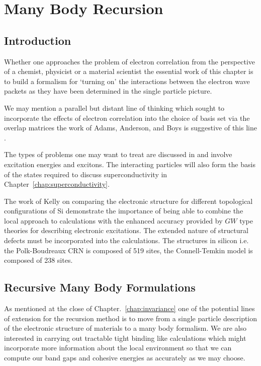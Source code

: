 \chapter{Many Body Recursion}
\section{Introduction}
Whether one approaches the problem of electron correlation from the
perspective of a chemist, physicist or a material scientist the 
essential work of this chapter is to build a formalism for `turning on'
the interactions between the electron wave packets as they have been 
determined in the single particle picture. 

We may mention a parallel but distant line of thinking
which sought to incorporate the effects of electron correlation
into the choice of basis set via the overlap matrices the work
of Adams, Anderson, and Boys is suggestive of this 
line \cite{adams62, weeks73}. 

The types of problems one may want to treat are discussed in \cite{slater49, kittel54}
and involve excitation energies and excitons. The interacting particles will also 
form the basis of the states required to discuss superconductivity 
in Chapter~\ref{chap:superconductivity}.

The work of Kelly \cite{kelly76} on comparing the electronic structure for different
topological configurations of Si demonstrate the importance of being able to combine
the local approach to calculations with the enhanced accuracy provided by
$GW$ type theories for describing electronic excitations. The extended nature
of structural defects must be incorporated into the calculations. The structures
in silicon i.e. the Polk-Boudreaux CRN is composed of 519 sites, the Connell-Temkin
model is composed of 238 sites.

\section{Recursive Many Body Formulations}
As mentioned at the close of Chapter.~\ref{chap:invariance} one of the potential
lines of extension for the recursion method is to move from a single particle 
description of the electronic structure of materials to a many body formalism.
We are also interested in carrying out tractable tight binding like calculations
which might incorporate more information about the local environment so that we
can compute our band gaps and cohesive energies as accurately as we may choose.

